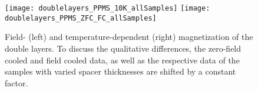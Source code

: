 \documentclass[\main/dresen_thesis.tex]{subfiles}
\begin{document}
  \label{sec:doubleLayers:vsm}

  \begin{figure}[tb]
    \centering
    \texttt{[image: doublelayers\_PPMS\_10K\_allSamples]}
    \texttt{[image: doublelayers\_PPMS\_ZFC\_FC\_allSamples]}
    \caption{\label{fig:doubleLayers:zfcFCData}Field- (left) and temperature-dependent (right) magnetization of the double layers. To discuss the qualitative differences, the zero-field cooled and field cooled data, as well as the respective data of the samples with varied spacer thicknesses are shifted by a constant factor.}
  \end{figure}

\end{document}
